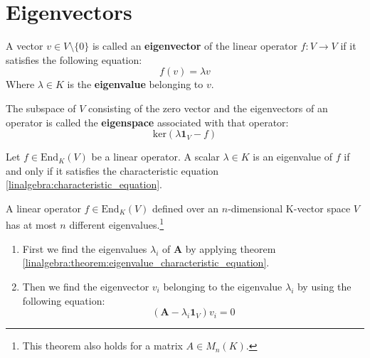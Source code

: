 \section{Eigenvectors}
	\begin{definition}[Eigenvector]
		A vector $v\in V\setminus\{0\}$ is called an \textbf{eigenvector} of the linear operator $f: V\rightarrow V$ if it satisfies the following equation:
        \begin{equation}
			f(v) = \lambda v
		\end{equation}
        Where $\lambda \in K$ is the \textbf{eigenvalue} belonging to $v$.
	\end{definition}
    \begin{definition}[Eigenspace]
		The subspace of $V$ consisting of the zero vector and the eigenvectors of an operator is called the \textbf{eigenspace} associated with that operator:
        \begin{equation}
			\text{ker}(\lambda\boldsymbol{1}_V - f)
		\end{equation}
	\end{definition}

	\begin{theorem}
    	\label{linalgebra:theorem:eigenvalue_characteristic_equation}
    	Let $f\in\text{End}_K(V)$ be a linear operator. A scalar $\lambda\in K$ is an eigenvalue of $f$ if and only if it satisfies the characteristic equation \ref{linalgebra:characteristic_equation}.
	\end{theorem}
    
    \begin{theorem}
		A linear operator $f\in\text{End}_K(V)$ defined over an $n$-dimensional K-vector space $V$ has at most $n$ different eigenvalues.\footnote{This theorem also holds for a matrix $A\in M_n(K)$.}
	\end{theorem}
    
    \begin{method}\leavevmode
		\begin{enumerate}
			\item First we find the eigenvalues $\lambda_i$ of $\mathbf{A}$ by applying theorem \ref{linalgebra:theorem:eigenvalue_characteristic_equation}.
            \item Then we find the eigenvector $v_i$ belonging to the eigenvalue $\lambda_i$ by using the following equation:
            \begin{equation}
				\label{linalgebra:eigenvectors:eigenspace}
                \left(\mathbf{A} - \lambda_i\mathbf{1}_V\right)v_i = 0
			\end{equation}
		\end{enumerate}
	\end{method}
    
